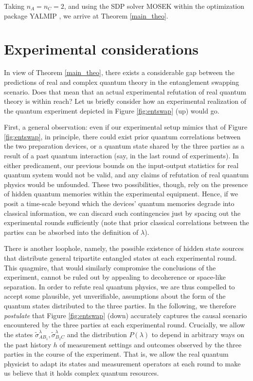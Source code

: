 \documentclass[onecolumn,prx,amsmath,amssymb,12pt]{revtex4-2}
\begin{document}
\begin{appendix}
Taking $n_A=n_C=2$, and using the SDP solver MOSEK \cite{mosek} within the optimization package YALMIP \cite{yalmip}, we arrive at Theorem \ref{main_theo}.



\section{Experimental considerations}
\label{sec:experimental}

In view of Theorem \ref{main_theo}, there exists a considerable gap between the predictions of real and complex quantum theory in the entanglement swapping scenario. Does that mean that an actual experimental refutation of real quantum theory is within reach? Let us briefly consider how an experimental realization of the quantum experiment depicted in Figure \ref{fig:entswap} (up) would go. 

First, a general observation: even if our experimental setup mimics that of Figure \ref{fig:entswap}, in principle, there could exist prior quantum correlations between the two preparation devices, or a quantum state shared by the three parties as a result of a past quantum interaction (say, in the last round of experiments). In either predicament, our previous bounds on the input-output statistics for real quantum system would not be valid, and any claims of refutation of real quantum physics would be unfounded. These two possibilities, though, rely on the presence of hidden quantum memories within the experimental equipment. Hence, if we posit a time-scale beyond which the devices' quantum memories degrade into classical information, we can discard such contingencies just by spacing out the experimental rounds sufficiently (note that prior classical correlations between the parties can be absorbed into the definition of $\lambda$). 

There is another loophole, namely, the possible existence of hidden state sources that distribute general tripartite entangled states at each experimental round. This quagmire, that would similarly compromise the conclusions of the experiment, cannot be ruled out by appealing to decoherence or space-like separation. In order to refute real quantum physics, we are thus compelled to accept some plausible, yet unverifiable, assumptions about the form of the quantum states distributed to the three parties. In the following, we therefore \emph{postulate} that Figure \ref{fig:entswap} (down) accurately captures the causal scenario encountered by the three parties at each experimental round. Crucially, we allow the states $\tilde{\sigma}_{AB_1}^{\lambda}, \tilde{\sigma}_{B_2C}^\lambda$ and the distribution $P(\lambda)$ to depend in arbitrary ways on the past history $h$ of measurement settings and outcomes observed by the three parties in the course of the experiment. That is, we allow the real quantum physicist to adapt its states and measurement operators at each round to make us believe that it holds complex quantum resources.


\end{appendix}
\end{document}
